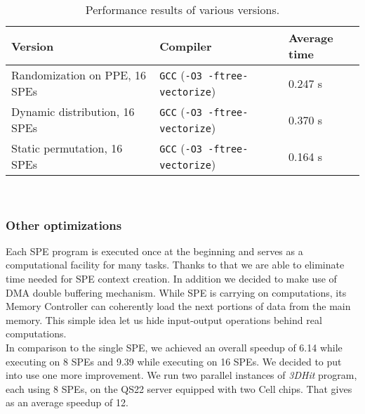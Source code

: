\documentclass[envcountsame,envcountchap]{svmono}
\newcommand{\prog}{\emph{3DHit}}
\begin{document}
\begin{table}[htb]
\begin{footnotesize}
\caption{Performance results of various versions.}
\label{tab:t2}
\newcommand{\m}{\hphantom{$-$}}
\newcommand{\cc}[1]{\multicolumn{1}{c}{#1}}
\renewcommand{\tabcolsep}{0.5pc} %
\renewcommand{\arraystretch}{1.2} %
\begin{tabular}{@{}lll}
\hline
\textbf{Version} & \textbf{Compiler} & \textbf{Average time} \\
\hline
Randomization on PPE, 16 SPEs & \texttt{GCC} (\texttt{-O3 -ftree-vectorize}) & 0.247 s \\
Dynamic distribution, 16 SPEs & \texttt{GCC} (\texttt{-O3 -ftree-vectorize}) &  0.370 s \\
Static permutation, 16 SPEs & \texttt{GCC} (\texttt{-O3 -ftree-vectorize}) & 0.164 s \\
\hline
\end{tabular}\\[2pt]
\end{footnotesize}
\end{table}

\subsubsection{Other optimizations}
Each SPE program is executed once at the beginning and serves as a computational
facility for many tasks.
Thanks to that we are able to eliminate time needed for SPE context creation.
In addition we decided to make use of DMA double buffering
mechanism.
While SPE is carrying on computations, its Memory Controller can coherently load
the next portions of data from the main memory.
This simple idea let us hide input-output operations behind real computations.\\
In comparison to the single SPE, we achieved an overall speedup of 6.14 while
executing on 8 SPEs and 9.39 while executing on 16 SPEs.
We decided to put into use one more improvement.
We run two parallel instances of \prog{} program, each using 8 SPEs, on the
QS22 server equipped with two Cell chips.
That gives as an average speedup of 12.
\end{document}

